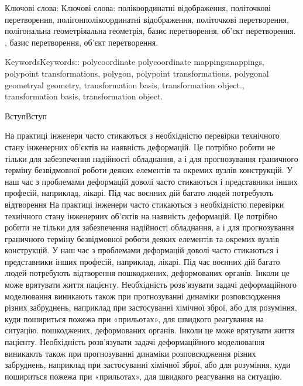 \documentclass[12pt,a4paper]{article}
\begin{document}
\par
Ключові слова: Ключові слова: полікоординатні відображення, політочкові перетворення, полігонполікоординатні відображення, політочкові перетворення, полігональна геометріяальна геометрія, базис перетворення, об’єкт перетворення. , базис перетворення, об’єкт перетворення.
\par
KeywordsKeywords::  polycoordinate polycoordinate mappingsmappings, polypoint transformations, polygon, polypoint transformations, polygonal geometryal geometry, transformation basis, transformation object., transformation basis, transformation object.
\par
ВступВступ
\par
На практиці інженери часто стикаються з необхідністю перевірки технічного стану інженерних об’єктів на наявність деформацій. Це потрібно робити не тільки для забезпечення надійності обладнання, а і для прогнозування граничного терміну безвідмовної роботи деяких елементів та окремих вузлів конструкцій. У наш час з проблемами деформацій доволі часто стикаються і представники інших професій, наприклад, лікарі. Під час воєнних дій багато людей потребують відтворення На практиці інженери часто стикаються з необхідністю перевірки технічного стану інженерних об’єктів на наявність деформацій. Це потрібно робити не тільки для забезпечення надійності обладнання, а і для прогнозування граничного терміну безвідмовної роботи деяких елементів та окремих вузлів конструкцій. У наш час з проблемами деформацій доволі часто стикаються і представники інших професій, наприклад, лікарі. Під час воєнних дій багато людей потребують відтворення пошкоджених, деформованих органів. Інколи це може врятувати життя пацієнту. Необхідність розв’язувати задачі деформаційного моделювання виникають також при прогнозуванні динаміки розповсюдження різних забруднень, наприклад при застосуванні хімічної зброї, або для розуміння, куди пошириться пожежа при «прильотах», для швидкого реагування на ситуацію.  пошкоджених, деформованих органів. Інколи це може врятувати життя пацієнту. Необхідність розв’язувати задачі деформаційного моделювання виникають також при прогнозуванні динаміки розповсюдження різних забруднень, наприклад при застосуванні хімічної зброї, або для розуміння, куди пошириться пожежа при «прильотах», для швидкого реагування на ситуацію.
\par
\end{document}
